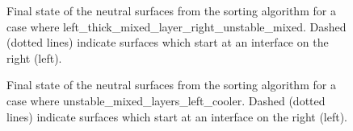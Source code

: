 \begin{figure}[ht]\begin{center}
  \caption{Final state of the neutral surfaces from the sorting algorithm for a case where left_thick_mixed_layer_right_unstable_mixed. Dashed (dotted lines) indicate surfaces which start at an interface on the right (left).}
  \label{figure:left_thick_mixed_layer_right_unstable_mixed} \end{center}
\end{figure}
\begin{figure}[ht]\begin{center}
  \caption{Final state of the neutral surfaces from the sorting algorithm for a case where unstable_mixed_layers_left_cooler. Dashed (dotted lines) indicate surfaces which start at an interface on the right (left).}
  \label{figure:unstable_mixed_layers_left_cooler} \end{center}
\end{figure}

